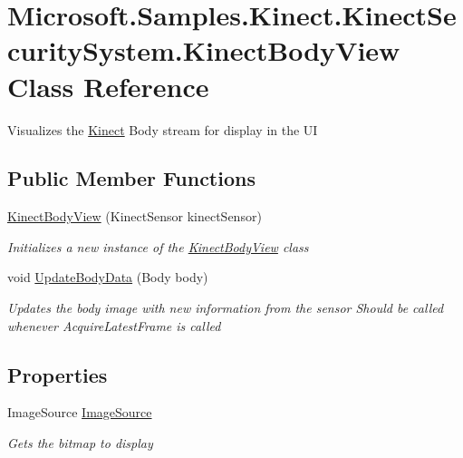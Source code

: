 \hypertarget{class_microsoft_1_1_samples_1_1_kinect_1_1_kinect_security_system_1_1_kinect_body_view}{}\section{Microsoft.\+Samples.\+Kinect.\+Kinect\+Security\+System.\+Kinect\+Body\+View Class Reference}
\label{class_microsoft_1_1_samples_1_1_kinect_1_1_kinect_security_system_1_1_kinect_body_view}


Visualizes the \hyperlink{namespace_microsoft_1_1_samples_1_1_kinect}{Kinect} Body stream for display in the UI  


\subsection*{Public Member Functions}
\begin{DoxyCompactItemize}
\item 
\hyperlink{class_microsoft_1_1_samples_1_1_kinect_1_1_kinect_security_system_1_1_kinect_body_view_ab41500442279abe76a0e452e939ddba3}{Kinect\+Body\+View} (Kinect\+Sensor kinect\+Sensor)
\begin{DoxyCompactList}\small\item\em Initializes a new instance of the \hyperlink{class_microsoft_1_1_samples_1_1_kinect_1_1_kinect_security_system_1_1_kinect_body_view}{Kinect\+Body\+View} class \end{DoxyCompactList}\item 
void \hyperlink{class_microsoft_1_1_samples_1_1_kinect_1_1_kinect_security_system_1_1_kinect_body_view_aae72677c96ccc53aacabfcbf314f8cfb}{Update\+Body\+Data} (Body body)
\begin{DoxyCompactList}\small\item\em Updates the body image with new information from the sensor Should be called whenever Acquire\+Latest\+Frame is called \end{DoxyCompactList}\end{DoxyCompactItemize}
\subsection*{Properties}
\begin{DoxyCompactItemize}
\item 
Image\+Source \hyperlink{class_microsoft_1_1_samples_1_1_kinect_1_1_kinect_security_system_1_1_kinect_body_view_a45db69ab0cd1a00c9e57377541d5fe8b}{Image\+Source}
\begin{DoxyCompactList}\small\item\em Gets the bitmap to display \end{DoxyCompactList}\end{DoxyCompactItemize}



